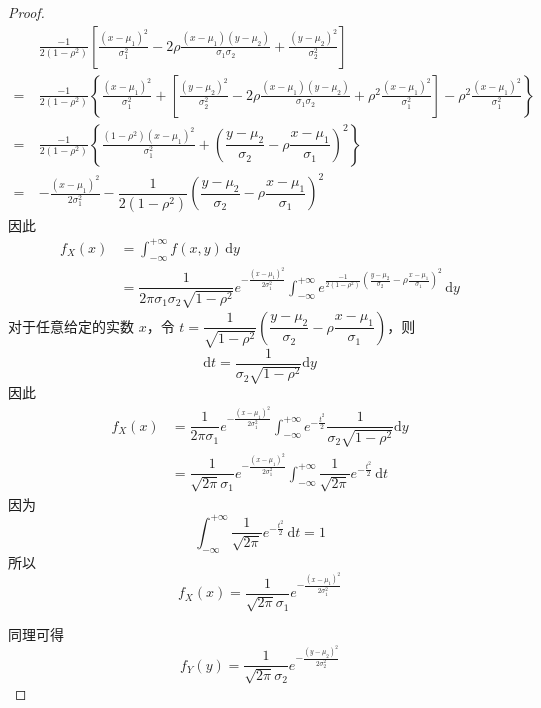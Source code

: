 \begin{proof}
    $$
    \begin{aligned}
        & \frac{-1}{2(1-\rho^2)} \left[ \frac{(x-\mu_1)^2}{\sigma_1^2} - 2 \rho \frac{(x-\mu_1)(y-\mu_2)}{\sigma_1 \sigma_2} + \frac{(y-\mu_2)^2}{\sigma_2^2} \right] \\
        = \  & \frac{-1}{2(1-\rho^2)} \left\{ \frac{(x-\mu_1)^2}{\sigma_1^2} + \left[ \frac{(y-\mu_2)^2}{\sigma_2^2} - 2 \rho \frac{(x-\mu_1)(y-\mu_2)}{\sigma_1 \sigma_2} + \rho^2 \frac{(x-\mu_1)^2}{\sigma_1^2} \right] - \rho^2 \frac{(x-\mu_1)^2}{\sigma_1^2} \right\} \\
        = \  & \frac{-1}{2(1-\rho^2)} \left\{ \frac{(1-\rho^2)(x-\mu_1)^2}{\sigma_1^2} + \left( \dfrac{y-\mu_2}{\sigma_2} - \rho \dfrac{x-\mu_1}{\sigma_1} \right)^2 \right\} \\
        = \  & -\frac{(x-\mu_1)^2}{2\sigma_1^2} - \dfrac{1}{2(1-\rho^2)} \left( \dfrac{y-\mu_2}{\sigma_2} - \rho \dfrac{x-\mu_1}{\sigma_1} \right)^2
    \end{aligned}
    $$
    因此
    $$
    \begin{aligned}
        f_{X}(x) &= \int_{-\infty}^{+\infty} f(x,y) \, \text{d}y \\
        &= \dfrac{1}{2 \pi \sigma_1 \sigma_2 \sqrt{1-\rho^2}} e^{-\frac{(x-\mu_1)^2}{2 \sigma_1^2}} \int_{-\infty}^{+\infty} e^{\frac{-1}{2(1-\rho^2)} \left( \frac{y-\mu_2}{\sigma_2} - \rho \frac{x-\mu_1}{\sigma_1} \right)^2} \, \text{d}y
    \end{aligned}
    $$
    对于任意给定的实数 $x$，令 $t = \dfrac{1}{\sqrt{1-\rho^2}} \left( \dfrac{y-\mu_2}{\sigma_2} - \rho \dfrac{x-\mu_1}{\sigma_1} \right)$，则
    $$
    \text{d}t = \dfrac{1}{\sigma_2 \sqrt{1-\rho^2}} \text{d}y
    $$
    因此
    $$
    \begin{aligned}
        f_{X}(x) &= \dfrac{1}{2 \pi \sigma_1} e^{-\frac{(x-\mu_1)^2}{2 \sigma_1^2}} \int_{-\infty}^{+\infty} e^{-\frac{t^2}{2}} \dfrac{1}{\sigma_2 \sqrt{1-\rho^2}} \text{d}y \\
        &= \dfrac{1}{\sqrt{2\pi} \sigma_1} e^{-\frac{(x-\mu_1)^2}{2 \sigma_1^2}} \int_{-\infty}^{+\infty} \dfrac{1}{\sqrt{2\pi}} e^{-\frac{t^2}{2}} \, \text{d}t
    \end{aligned}
    $$
    因为
    $$
    \int_{-\infty}^{+\infty} \dfrac{1}{\sqrt{2\pi}} e^{-\frac{t^2}{2}} \, \text{d}t = 1
    $$
    所以
    $$
    f_{X}(x) = \dfrac{1}{\sqrt{2\pi} \sigma_1} e^{-\frac{(x-\mu_1)^2}{2 \sigma_1^2}}
    $$

    同理可得
    $$
    f_{Y}(y) = \dfrac{1}{\sqrt{2\pi} \sigma_2} e^{-\frac{(y-\mu_2)^2}{2 \sigma_2^2}}
    $$
\end{proof}

